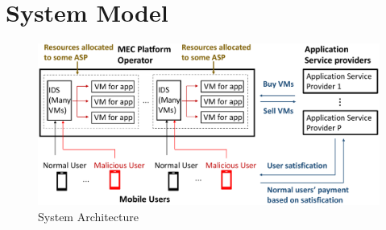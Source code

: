 \documentclass[10pt,journal, compsoc]{IEEEtran}
\begin{document}
\section{System Model}\label{sec:system_model}
\begin{figure}
\centering
\includegraphics[width= 0.6\columnwidth]{5GDDoS_Game_system_architecture.pdf}
\caption{System Architecture}
\label{fig:system}
\end{figure}

\end{document}
